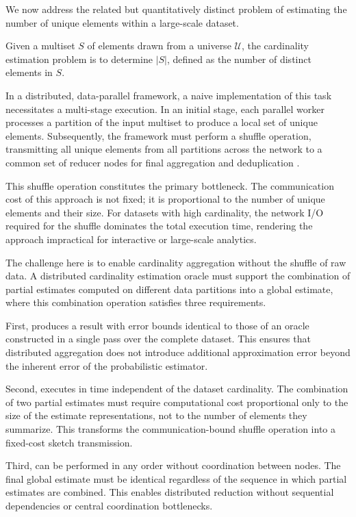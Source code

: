 We now address the related but quantitatively distinct problem of estimating the number of unique elements within a large-scale dataset.

\begin{definition}
    Given a multiset $S$ of elements drawn from a universe $\mathcal{U}$, the cardinality estimation problem is to determine $|S|$, defined as the number of distinct elements in $S$.
\end{definition}

In a distributed, data-parallel framework, a naive implementation of this task necessitates a multi-stage execution. In an initial stage, each parallel worker processes a partition of the input multiset to produce a local set of unique elements. Subsequently, the framework must perform a shuffle operation, transmitting all unique elements from all partitions across the network to a common set of reducer nodes for final aggregation and deduplication \cite{Zaharia2012ResilientDD}.

This shuffle operation constitutes the primary bottleneck. The communication cost of this approach is not fixed; it is proportional to the number of unique elements and their size. For datasets with high cardinality, the network I/O required for the shuffle dominates the total execution time, rendering the approach impractical for interactive or large-scale analytics.

The challenge here is to enable cardinality aggregation without the shuffle of raw data. A distributed cardinality estimation oracle must support the combination of partial estimates computed on different data partitions into a global estimate, where this combination operation satisfies three requirements.

First, produces a result with error bounds identical to those of an oracle constructed in a single pass over the complete dataset. This ensures that distributed aggregation does not introduce additional approximation error beyond the inherent error of the probabilistic estimator.

Second, executes in time independent of the dataset cardinality. The combination of two partial estimates must require computational cost proportional only to the size of the estimate representations, not to the number of elements they summarize. This transforms the communication-bound shuffle operation into a fixed-cost sketch transmission.

Third, can be performed in any order without coordination between nodes. The final global estimate must be identical regardless of the sequence in which partial estimates are combined. This enables distributed reduction without sequential dependencies or central coordination bottlenecks.

